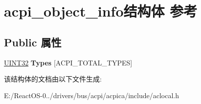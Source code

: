 \hypertarget{structacpi__object__info}{}\section{acpi\+\_\+object\+\_\+info结构体 参考}
\label{structacpi__object__info}
\subsection*{Public 属性}
\begin{DoxyCompactItemize}
\item 
\mbox{\label{structacpi__object__info_a146c3ade097255d7507db38094cbbb08}} 
\hyperlink{_processor_bind_8h_ae1e6edbbc26d6fbc71a90190d0266018}{U\+I\+N\+T32} {\bfseries Types} \mbox{[}A\+C\+P\+I\+\_\+\+T\+O\+T\+A\+L\+\_\+\+T\+Y\+P\+ES\mbox{]}
\end{DoxyCompactItemize}


该结构体的文档由以下文件生成\+:\begin{DoxyCompactItemize}
\item 
E\+:/\+React\+O\+S-\/0../drivers/bus/acpi/acpica/include/aclocal.\+h\end{DoxyCompactItemize}
